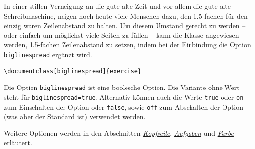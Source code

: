 \documentclass{exercise}
\begin{document}
    In einer stillen Verneigung an die gute alte Zeit und vor allem die gute
    alte Schreibmaschine, neigen noch heute viele Menschen dazu, den 1.5-fachen
    für den einzig waren Zeilenabstand zu halten. Um diesem Umstand gerecht zu
    werden -- oder einfach um möglichst viele Seiten zu füllen -- kann die
    Klasse angewiesen werden, 1.5-fachen Zeilenabstand zu setzen, indem bei
    der Einbindung die Option \lstinline{biglinespread} ergänzt wird.
    \begin{lstlisting}[gobble=6]
      \documentclass[biglinespread]{exercise}
    \end{lstlisting}

    Die Option \lstinline{biglinespread} ist eine boolesche Option. Die Variante
    ohne Wert steht für \lstinline{biglinespread=true}. Alternativ können auch die
    Werte \lstinline{true} oder \lstinline{on} zum Einschalten der Option oder
    \lstinline{false}, sowie \lstinline{off} zum Abschalten der Option (was aber der
    Standard ist) verwendet werden.

    Weitere Optionen werden in den Abschnitten
    \emph{\hyperref[section-kopfzeile]{Kopfzeile}},
    \emph{\hyperref[section-aufgaben]{Aufgaben}} und
    \emph{\hyperref[section-farbe]{Farbe}} erläutert.
\end{document}
